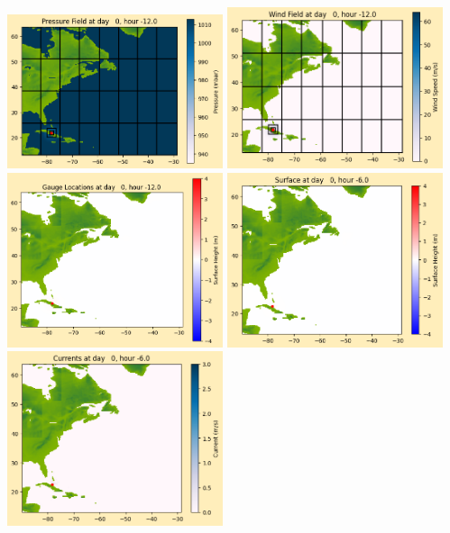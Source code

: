 \documentclass[11pt]{article}
\begin{document}
\includegraphics[width=0.475\textwidth]{frame0010fig1012.png}
\vskip 10pt 
\includegraphics[width=0.475\textwidth]{frame0010fig1013.png}
\includegraphics[width=0.475\textwidth]{frame0010fig1014.png}
\vskip 10pt 
\includegraphics[width=0.475\textwidth]{frame0011fig1001.png}
\includegraphics[width=0.475\textwidth]{frame0011fig1002.png}
\end{document}
